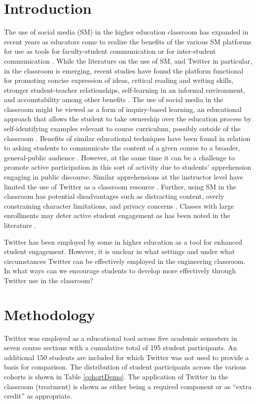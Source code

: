\documentclass[12pt]{article}
\begin{document}
\section*{Introduction}
The use of social media (SM) in the higher education classroom has expanded in recent years as educators come to realize the benefits of the various SM platforms for use as tools for faculty-student communication or for inter-student communication \cite{blessing_using_2012}. While the literature on the use of SM, and Twitter in particular, in the classroom is emerging, recent studies have found the platform functional for promoting concise expression of ideas, critical reading and writing skills, stronger student-teacher relationships, self-learning in an informal environment, and accountability among other benefits \cite{shiffman_twitter_2012}. The use of social media in the classroom might be viewed as a form of inquiry-based learning, an educational approach that allows the student to take ownership over the education process by self-identifying examples relevant to course curriculum, possibly outside of the classroom \cite{magnussen_impact_2000, prince_does_2004}. Benefits of similar educational techniques have been found in relation to asking students to communicate the content of a given course to a broader, general-public audience \cite{junco_effect_2011, ha_influence_2013}. However, at the same time it can be a challenge to promote active participation in this sort of activity due to students’ apprehension engaging in public discourse. Similar apprehensions at the instructor level have limited the use of Twitter as a classroom resource \cite{carpenter_how_2014}. Further, using SM in the classroom has potential disadvantages such as distracting content, overly constraining character limitations, and privacy concerns \cite{dhir_tweeters_2013}. Classes with large enrollments may deter active student engagement as has been noted in the literature \cite{ahlfeldt_measurement_2005}.  

Twitter has been employed by some in higher education as a tool for enhanced student engagement. However, it is unclear in what settings and under what circumstances Twitter can be effectively employed in the engineering classroom. In what ways can we encourage students to develop more effectively through Twitter use in the classroom?


\section*{Methodology}
Twitter was employed as a educational tool across five academic semesters in seven course sections with a cumulative total of 195 student participants. An additional 150 students are included for which Twitter was not used to provide a basis for comparison. The distribution of student participants across the various cohorts is shown in Table \ref{cohortDemo}. The application of Twitter in the classroom (treatment) is shown as either being a required component or as ``extra credit'' as appropriate.
\end{document}
